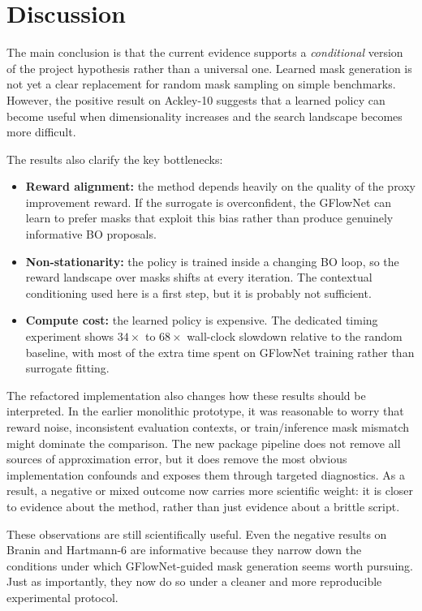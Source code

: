 \documentclass{article}
\begin{document}
\section{Discussion}

The main conclusion is that the current evidence supports a \emph{conditional} version of the project hypothesis rather than a universal one. Learned mask generation is not yet a clear replacement for random mask sampling on simple benchmarks. However, the positive result on Ackley-10 suggests that a learned policy can become useful when dimensionality increases and the search landscape becomes more difficult.

The results also clarify the key bottlenecks:

\begin{itemize}
    \item \textbf{Reward alignment:} the method depends heavily on the quality of the proxy improvement reward. If the surrogate is overconfident, the GFlowNet can learn to prefer masks that exploit this bias rather than produce genuinely informative BO proposals.
    \item \textbf{Non-stationarity:} the policy is trained inside a changing BO loop, so the reward landscape over masks shifts at every iteration. The contextual conditioning used here is a first step, but it is probably not sufficient.
    \item \textbf{Compute cost:} the learned policy is expensive. The dedicated timing experiment shows $34\times$ to $68\times$ wall-clock slowdown relative to the random baseline, with most of the extra time spent on GFlowNet training rather than surrogate fitting.
\end{itemize}

The refactored implementation also changes how these results should be interpreted. In the earlier monolithic prototype, it was reasonable to worry that reward noise, inconsistent evaluation contexts, or train/inference mask mismatch might dominate the comparison. The new package pipeline does not remove all sources of approximation error, but it does remove the most obvious implementation confounds and exposes them through targeted diagnostics. As a result, a negative or mixed outcome now carries more scientific weight: it is closer to evidence about the method, rather than just evidence about a brittle script.

These observations are still scientifically useful. Even the negative results on Branin and Hartmann-6 are informative because they narrow down the conditions under which GFlowNet-guided mask generation seems worth pursuing. Just as importantly, they now do so under a cleaner and more reproducible experimental protocol.
\end{document}
